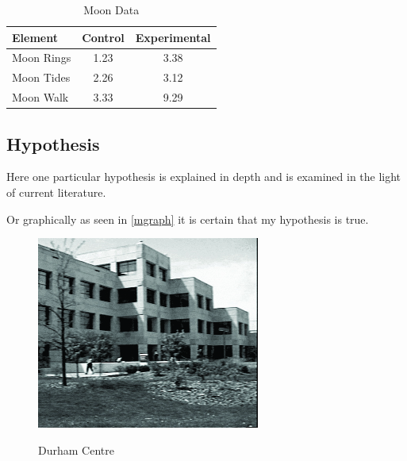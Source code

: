 \begin{table}[h!tb] \centering
    \caption{Moon Data}
    \label{data}
    \begin{tabular}{lcc} \hline
        \textbf{Element} & \textbf{Control} & \textbf{Experimental} \\ \hline
        Moon Rings & 1.23 & 3.38 \\
        Moon Tides & 2.26 & 3.12 \\
        Moon Walk & 3.33 & 9.29 \\ \hline
    \end{tabular}
\end{table}


\subsection{Hypothesis}

Here one particular hypothesis is explained in depth
and is examined in the light of current literature.

Or graphically as seen in \autoref{mgraph}
it is certain that my hypothesis is true.

\begin{figure}[h!tb] \centering

\includegraphics[alt={Here is some alt text}]{Images/dc5}

\caption{Durham Centre}
\label{mgraph}
\end{figure}

